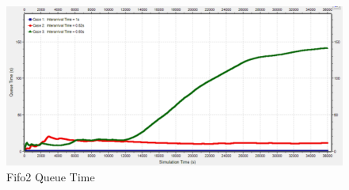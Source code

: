 \documentclass{article}
\begin{document}
\begin{figure}[h!]
	\begin{center}
	\includegraphics[scale=0.65]{Images/Fifo2_QueueTime.PNG}
	\vspace{-.25cm}
	\caption{Fifo2 Queue Time}
	\label{fifo2_qtime}
	\end{center}
\end{figure}
\end{document}
